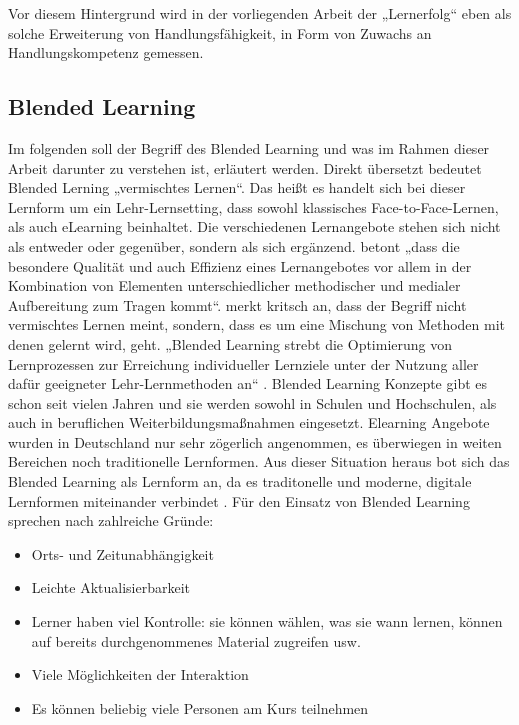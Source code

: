 \documentclass[12pt,smallheadings, bibliography=totoc]{scrartcl}
\begin{document}
Vor diesem Hintergrund wird in der vorliegenden Arbeit der „Lernerfolg``
eben als solche Erweiterung von Handlungsfähigkeit, in Form von Zuwachs
an Handlungskompetenz gemessen.

\subsection{Blended Learning}\label{blended-learning}

Im folgenden soll der Begriff des Blended Learning und was im Rahmen
dieser Arbeit darunter zu verstehen ist, erläutert werden. Direkt
übersetzt bedeutet Blended Lerning „vermischtes Lernen``. Das heißt es
handelt sich bei dieser Lernform um ein Lehr-Lernsetting, dass sowohl
klassisches Face-to-Face-Lernen, als auch eLearning beinhaltet. Die
verschiedenen Lernangebote stehen sich nicht als entweder oder
gegenüber, sondern als sich ergänzend.
\textcite[3]{kerres2001multimediale} betont „dass die besondere Qualität
und auch Effizienz eines Lernangebotes vor allem in der Kombination von
Elementen unterschiedlicher methodischer und medialer Aufbereitung zum
Tragen kommt``. \textcite[45]{ehlers2011qualitat} merkt kritsch an, dass
der Begriff nicht vermischtes Lernen meint, sondern, dass es um eine
Mischung von Methoden mit denen gelernt wird, geht. „Blended Learning
strebt die Optimierung von Lernprozessen zur Erreichung individueller
Lernziele unter der Nutzung aller dafür geeigneter Lehr-Lernmethoden
an`` \parencite[46]{ehlers2011qualitat}. Blended Learning Konzepte gibt
es schon seit vielen Jahren und sie werden sowohl in Schulen und
Hochschulen, als auch in beruflichen Weiterbildungsmaßnahmen eingesetzt.
Elearning Angebote wurden in Deutschland nur sehr zögerlich angenommen,
es überwiegen in weiten Bereichen noch traditionelle Lernformen. Aus
dieser Situation heraus bot sich das Blended Learning als Lernform an,
da es traditonelle und moderne, digitale Lernformen miteinander
verbindet \parencite{Maihack2015}. Für den Einsatz von Blended Learning
sprechen nach \textcite{thomas2000evaluating} zahlreiche Gründe:


\begin{itemize}
\item
  Orts- und Zeitunabhängigkeit
\item
  Leichte Aktualisierbarkeit
\item
  Lerner haben viel Kontrolle: sie können wählen, was sie wann lernen,
  können auf bereits durchgenommenes Material zugreifen usw.
\item
  Viele Möglichkeiten der Interaktion
\item
  Es können beliebig viele Personen am Kurs teilnehmen
\end{itemize}
\end{document}
